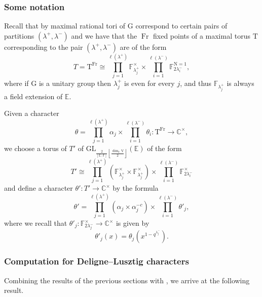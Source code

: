 \documentclass[12pt, reqno]{amsart}
\theoremstyle{definition}
\theoremstyle{definition}
\theoremstyle{definition}
\newcommand{\cComplex}{\mathbb{C}}
\newcommand{\multiplicativegroup}[1]{#1^{\times}}
\newcommand{\lengthof}{\ell}
\newcommand{\hermitianSpace}{\mathrm{V}}
\newcommand{\grpIndex}[2]{\left[#1:#2\right]}
\newcommand{\minusInvolution}[1]{#1^{-c}}
\newcommand{\GL}{\mathrm{GL}}
\newcommand{\aFieldNorm}{\mathrm{N}}
\newcommand{\finiteField}{\mathbb{F}}
\newcommand{\quadraticExtension}{\mathbb{E}}
\newcommand{\finiteFieldExtension}[1]{\finiteField_{#1}}
\newcommand{\NormOneGroup}[1]{\finiteFieldExtension{#1}^{\aFieldNorm = 1}}
\newcommand{\Frobenius}{\operatorname{Fr}}
\newcommand{\algebraicGroup}[1]{\boldsymbol{\mathrm{#1}}}
\begin{document}
\subsubsection{Some notation}
Recall that by  maximal rational tori of $\algebraicGroup{G}$ correspond to certain pairs of partitions $\left(\lambda^+, \lambda^-\right)$ and we have that the $\Frobenius$ fixed points of a maximal torus $\algebraicGroup{T}$ corresponding to the pair $\left(\lambda^+, \lambda^-\right)$ are of the form $$T = \algebraicGroup{T}^{\Frobenius} \cong \prod_{j=1}^{\lengthof(\lambda^+)} \multiplicativegroup{\finiteFieldExtension{\lambda_j^{+}}} \times \prod_{i=1}^{\lengthof(\lambda^-)} \NormOneGroup{2 \lambda_i^{-}},$$
where if $\algebraicGroup{G}$ is a unitary group then $\lambda_j^{+}$ is even for every $j$, and thus $\finiteFieldExtension{\lambda^+_j}$ is always a field extension of $\quadraticExtension$.

Given a character $$\theta = \prod_{j=1}^{\lengthof(\lambda^+)} \alpha_j \times \prod_{i=1}^{\lengthof(\lambda^-)} \theta_i \colon \algebraicGroup{T}^{\Frobenius} \to \multiplicativegroup{\cComplex},$$ we choose a torus of $T'$ of $\GL_{\frac{2}{\grpIndex{\quadraticExtension}{\finiteField}} \left\lfloor\frac{\dim_{\finiteField} \hermitianSpace}{2}\right\rfloor}\left(\quadraticExtension\right)$ of the form $$T' \cong \prod_{j=1}^{\lengthof(\lambda^+)} \left(\multiplicativegroup{\finiteFieldExtension{\lambda_j^{+}}} \times \multiplicativegroup{\finiteFieldExtension{\lambda_j^{+}}}\right) \times \prod_{i=1}^{\lengthof(\lambda^-)} \multiplicativegroup{\finiteFieldExtension{2 \lambda_i^{-}}}$$ and define a character $\theta' \colon T' \to \multiplicativegroup{\cComplex}$ by the formula
$$\theta' = \prod_{j=1}^{\lengthof(\lambda^+)} \left(\alpha_j \times \minusInvolution{\alpha}_j\right) \times \prod_{i=1}^{\lengthof(\lambda^-)} \theta'_j,$$
where we recall that $\theta'_j \colon \multiplicativegroup{\finiteFieldExtension{2 \lambda_j^{-}}} \to \multiplicativegroup{\cComplex}$ is given by $$\theta'_j\left(x\right) = \theta_j\left(x^{1-q^{\lambda_j^-}}\right).$$

\subsubsection{Computation for Deligne--Lusztig characters}
Combining the results of the previous sections with , we arrive at the following result.
\end{document}
